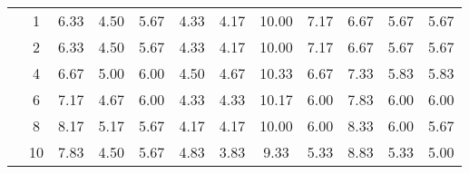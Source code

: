 \begin{table}[H]
\begin{tabular}{|c|c|c c c c c|c c c c c|}
\multicolumn{1}{|c|}{ \multirow{6}{*}{\rotatebox[origin=c]{90}{\textbf{K-vizinhos}}} }
&1	&6.33	&4.50	&5.67	&4.33	&4.17	&10.00&	7.17&	6.67&	5.67&	5.67\\\cline{2-12}
&2	&6.33	&4.50	&5.67	&4.33	&4.17	&10.00&	7.17&	6.67&	5.67&	5.67\\\cline{2-12}
&4	&6.67	&5.00	&6.00	&4.50	&4.67	&10.33&	6.67&	7.33&	5.83&	5.83\\\cline{2-12}
&6	&7.17	&4.67	&6.00	&4.33	&4.33	&10.17&	6.00&	7.83&	6.00&	6.00\\\cline{2-12}
&8	&8.17	&5.17	&5.67	&4.17	&4.17	&10.00&	6.00&	8.33&	6.00&	5.67\\\cline{2-12}
&10	&7.83	&4.50	&5.67	&4.83	&3.83	&9.33	&5.33	&8.83	&5.33	&5.00 \\\midrule





	\end{tabular}
\end{table}




